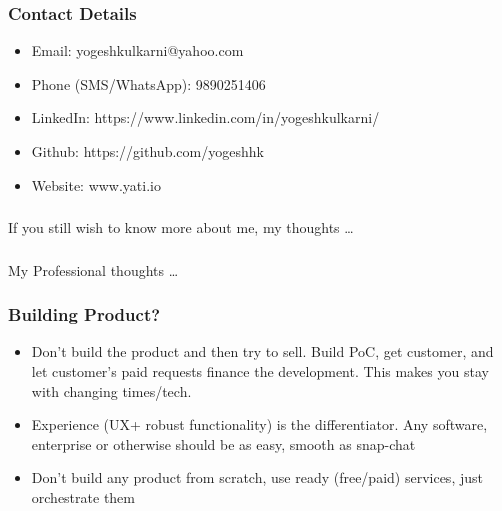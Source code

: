 \begin{frame}[fragile]\frametitle{Contact Details}
\begin{itemize}
\item Email: yogeshkulkarni@yahoo.com
\item Phone (SMS/WhatsApp): 9890251406
\item LinkedIn: https://www.linkedin.com/in/yogeshkulkarni/
\item Github: https://github.com/yogeshhk
\item Website: www.yati.io
\end{itemize}
\end{frame}

\begin{frame}[fragile]\frametitle{}
\begin{center}
{\Large If you still wish to know more about me, my thoughts \ldots}
\end{center}
\end{frame}

\begin{frame}[fragile]\frametitle{}
\begin{center}
{\Large My Professional thoughts \ldots}
\end{center}
\end{frame}

\begin{frame}[fragile]\frametitle{Building Product?}
\begin{itemize}
\item Don't build the product and then try to sell. Build PoC, get customer, and let customer's paid requests finance the development. This makes you stay with changing times/tech.
\item Experience (UX+ robust functionality) is the differentiator. Any software, enterprise or otherwise should be as easy, smooth as snap-chat
\item Don't build any product from scratch, use ready (free/paid) services, just orchestrate them
\end{itemize}
\end{frame}

